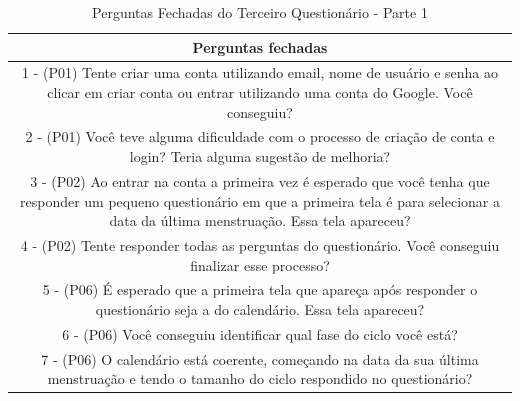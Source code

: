 \begin{table}[ht]
    \centering
    \caption{Perguntas Fechadas do Terceiro Questionário - Parte 1}
    \label{tab15}
    \begin{tabular}{c}
        \toprule
        \textbf{Perguntas fechadas} \\
        \midrule
        \begin{minipage} [t] {1\textwidth} 1 - (P01) Tente criar uma conta utilizando email, nome de usuário e senha ao clicar em criar conta ou entrar utilizando uma conta do Google. Você conseguiu?
        \end{minipage} \\
        \midrule
        \begin{minipage} [t] {1\textwidth} 2 - (P01) Você teve alguma dificuldade com o processo de criação de conta e login? Teria alguma sugestão de melhoria?
        \end{minipage}\\
        \midrule
        \begin{minipage} [t] {1\textwidth} 3 - (P02) Ao entrar na conta a primeira vez é esperado que você tenha que responder um pequeno questionário em que a primeira tela é para selecionar a data da última menstruação. Essa tela apareceu? \end{minipage} \\
        \midrule
        \begin{minipage} [t] {1\textwidth} 4 - (P02) Tente responder todas as perguntas do questionário. Você conseguiu finalizar esse processo? \end{minipage}  \\
        \midrule
        \begin{minipage} [t] {1\textwidth} 5 - (P06) É esperado que a primeira tela que apareça após responder o questionário seja a do calendário. Essa tela apareceu? \end{minipage}\\
        \midrule
        \begin{minipage} [t] {1\textwidth} 6 - (P06) Você conseguiu identificar qual fase do ciclo você está? \end{minipage} \\
        \midrule
        \begin{minipage} [t] {1\textwidth} 7 - (P06) O calendário está coerente, começando na data da sua última menstruação e tendo o tamanho do ciclo respondido no questionário? \end{minipage}\\

\end{tabular}
\end{table}
